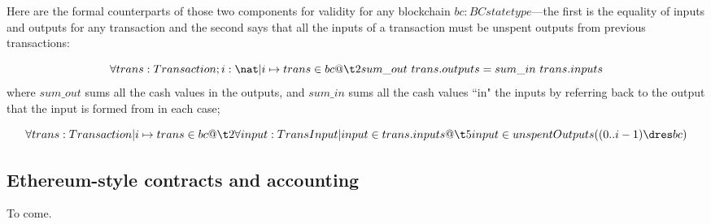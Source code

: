 \documentclass[11pt]{amsart}
\begin{document}
Here are the formal counterparts of those two components for validity for any blockchain $bc : BCstatetype$---the first is the equality of inputs and outputs for any transaction and the second says that all the inputs of a transaction must be unspent outputs from previous transactions:

\[
\forall trans : Transaction; i : \nat | i \mapsto trans \in bc @\\
          \t2 sum\_out\ trans.outputs = sum\_in\  trans.inputs
\]
where $sum\_out$ sums all the cash values in the outputs, and $sum\_in$ sums all the cash values ``in" the inputs by referring back to the output that the input is formed from in each case;

\[
\forall trans : Transaction | i \mapsto trans \in  bc @\\
         \t2 \forall input : TransInput | input \in trans.inputs @ \\
                     \t5input \in unspentOutputs ((0..i-1) \dres bc)
\]


\subsection{Ethereum-style contracts and accounting}

To come.
\end{document}
